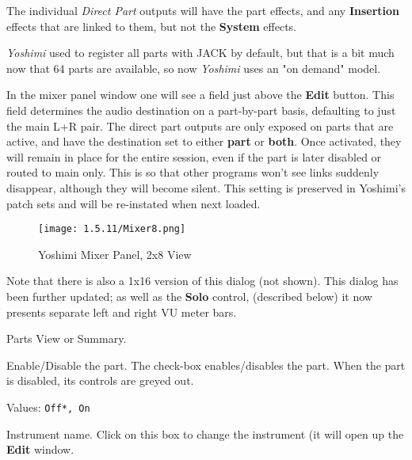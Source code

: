    The individual \textsl{Direct Part} outputs will have the part effects, and any
   \textbf{Insertion} effects that are linked to them, but not the
   \textbf{System} effects.

   \textsl{Yoshimi} used to register all parts with JACK by default, but that
   is a bit much now that 64 parts are available, so now \textsl{Yoshimi}
   uses an "on demand" model.

   In the mixer panel window one will see a field just above the
   \textbf{Edit} button.
   This field determines the audio destination on a part-by-part basis,
   defaulting to just the main L+R pair. The direct part outputs are only
   exposed on parts that are active, and have the destination set to either
   \textbf{part} or \textbf{both}.
   Once activated, they will remain in place for the entire session, even if
   the part is later disabled or routed to main only. This is so that other
   programs won't see links suddenly disappear, although they will become
   silent.  This setting is preserved in Yoshimi's patch sets and will be
   re-instated when next loaded.

\begin{figure}[H]
   \centering
   \texttt{[image: 1.5.11/Mixer8.png]}
   \caption[Yoshimi Mixer Panel]{Yoshimi Mixer Panel, 2x8 View}
   \label{fig:yoshimi_part_panel_2x8}
\end{figure}

   Note that there is also a 1x16 version of this dialog (not shown).
   This dialog has been further updated; as well as the \textbf{Solo}
   control, (described below) it now presents separate left and right
   VU meter bars.

   \setcounter{ItemCounter}{0}      %

   Parts View or Summary.

   Enable/Disable the part. The check-box enables/disables the part.
   When the part is disabled, its controls are greyed out.

   Values: \texttt{Off*, On}

   Instrument name. Click on this box to change the instrument (it will
   open up the \textbf{Edit} window.

